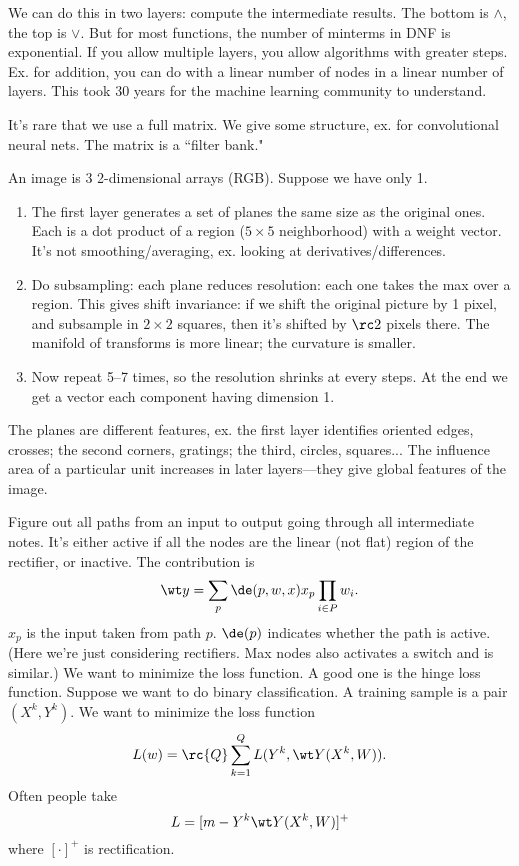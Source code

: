 We can do this in two layers: compute the intermediate results. The bottom is $\wedge$, the top is $\vee$. But for most functions, the number of minterms in DNF is exponential. If you allow multiple layers, you allow algorithms with greater steps. Ex. for addition, you can do with a linear number of nodes in a linear number of layers. %
This took 30 years for the machine learning community to understand.


It's rare that we use a full matrix. We give some structure, ex. for convolutional neural nets. The matrix is a ``filter bank."

An image is 3 2-dimensional arrays (RGB). Suppose we have only 1. 
\begin{enumerate}
\item
The first layer generates a set of planes the same size as the original ones. 
Each is a dot product of a region ($5\times 5$ neighborhood) with a weight vector. It's not smoothing/averaging, ex. looking at derivatives/differences.
\item
Do subsampling: each plane reduces resolution: each one takes the max over a region. This gives shift invariance: if we shift the original picture by 1 pixel, and subsample in $2\times2$ squares, then it's shifted by $\rc2$ pixels there. 
 The manifold of transforms is more linear; the curvature is smaller.
\item
Now repeat 5--7 times, so the resolution shrinks at every steps. At the end we get a vector each component having dimension 1.
\end{enumerate}
The planes are different features, ex. the first layer identifies oriented edges, crosses; the second corners, gratings; the third, circles, squares... The influence area of a particular unit increases in later layers---they give global features of the image.


Figure out all paths from an input to output going through all intermediate notes. It's either active if all the nodes are the linear (not flat) region of the rectifier, or inactive. The contribution is
\[
\wt y=\sum_p\de(p,w,x)x_p\prod_{i\in P}w_i.
\]
$x_p$ is the input taken from path $p$.
$\de(p)$ indicates whether the path is active. (Here we're just considering rectifiers. Max nodes also activates a switch and is similar.) 
%
We want to minimize the loss function. A good one is the hinge loss function. Suppose we want to do binary classification. A training sample is a pair $(X^k,Y^k)$. We want to minimize the loss function
\[
L(w)=\rc{Q}\sum_{k=1}^Q L(Y^k,\wt Y(X^k ,W)).
\]
Often people take
\[
L=[m-Y^k\wt Y (X^k,W)]^+
\]
where $[\cdot]^+$ is rectification.

